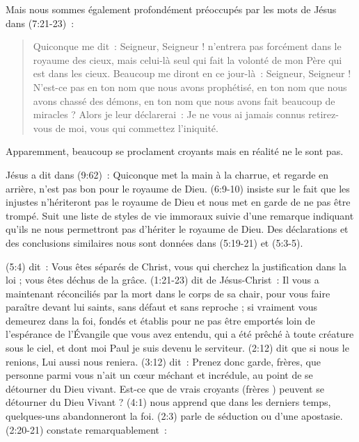 Mais nous sommes également profondément préoccupés par les mots de Jésus dans (7:21-23)~:

\begin{quote}
\begin{digestpar}{}
 \og Quiconque me dit~: Seigneur,
 Seigneur ! n'entrera pas forcément
 dans le royaume des cieux, mais celui-là seul qui fait la volonté de mon Père
 qui est dans les cieux. Beaucoup me diront en ce jour-là~: Seigneur, Seigneur !
 N'est-ce pas en ton nom que nous avons prophétisé, en ton nom que nous avons
 chassé des démons, en ton nom que nous avons fait beaucoup de miracles ?
 Alors je leur déclarerai~: Je ne vous ai jamais connus retirez-vous de moi,
 vous qui commettez l'iniquité. \fg{}
\end{digestpar}
\end{quote}

Apparemment, beaucoup se proclament croyants mais en réalité ne le sont pas.

Jésus a dit dans (9:62)~: \og Quiconque met la main à la charrue,
 et regarde en arrière, n'est pas bon pour le royaume de Dieu. \fg{}
 (6:9-10) insiste sur le fait que
 \og les injustes n'hériteront pas le royaume de Dieu \fg{}
 et nous met en garde de ne pas être trompé.
 Suit une liste de styles de vie immoraux suivie d'une remarque
 indiquant qu'ils ne nous permettront pas d'hériter le royaume de Dieu.
 Des déclarations et des conclusions similaires nous sont données
 dans (5:19-21) et (5:3-5).

(5:4) dit~:
 \og Vous êtes séparés de Christ, vous qui cherchez la justification
 dans la loi ; vous êtes déchus de la grâce. \fg{}
 (1:21-23) dit de Jésus-Christ~:
 \og Il vous a maintenant réconciliés par la mort dans le corps de sa chair,
 pour vous faire paraître devant lui saints, sans défaut et sans reproche ;
 si vraiment vous demeurez dans la foi, fondés et établis pour ne pas être
 emportés loin de l'espérance de l'Évangile que vous avez entendu,
 qui a été prêché à toute créature sous le ciel, et dont moi Paul
 je suis devenu le serviteur. \fg{}
 (2:12) dit que \og si nous le renions, Lui aussi nous reniera. \fg{}
 (3:12) dit~:
 \og Prenez donc garde, frères, que personne parmi vous n'ait un cœur méchant
 et incrédule, au point de se détourner du Dieu vivant. \fg{}
 Est-ce que de vrais croyants (\og frères \fg{}) peuvent se détourner du Dieu Vivant ?
 (4:1) nous apprend que \og dans les derniers temps,
 quelques-uns abandonneront la foi. \fg{}
 (2:3) parle de \og séduction \fg{} ou d'une apostasie.
 (2:20-21) constate remarquablement~:

